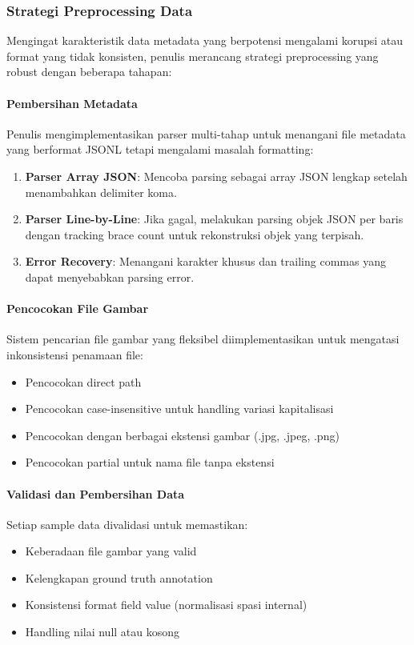 \subsubsection{Strategi Preprocessing Data}
\label{subsubsec:strategi-preprocessing-data}

Mengingat karakteristik data metadata yang berpotensi mengalami korupsi atau format yang tidak konsisten, penulis merancang strategi preprocessing yang robust dengan beberapa tahapan:

\paragraph{Pembersihan Metadata}
Penulis mengimplementasikan parser multi-tahap untuk menangani file metadata yang berformat JSONL tetapi mengalami masalah formatting:
\begin{enumerate}
    \item \textbf{Parser Array JSON}: Mencoba parsing sebagai array JSON lengkap setelah menambahkan delimiter koma.
    \item \textbf{Parser Line-by-Line}: Jika gagal, melakukan parsing objek JSON per baris dengan tracking brace count untuk rekonstruksi objek yang terpisah.
    \item \textbf{Error Recovery}: Menangani karakter khusus dan trailing commas yang dapat menyebabkan parsing error.
\end{enumerate}

\paragraph{Pencocokan File Gambar}
Sistem pencarian file gambar yang fleksibel diimplementasikan untuk mengatasi inkonsistensi penamaan file:
\begin{itemize}
    \item Pencocokan direct path
    \item Pencocokan case-insensitive untuk handling variasi kapitalisasi
    \item Pencocokan dengan berbagai ekstensi gambar (.jpg, .jpeg, .png)
    \item Pencocokan partial untuk nama file tanpa ekstensi
\end{itemize}

\paragraph{Validasi dan Pembersihan Data}
Setiap sample data divalidasi untuk memastikan:
\begin{itemize}
    \item Keberadaan file gambar yang valid
    \item Kelengkapan ground truth annotation
    \item Konsistensi format field value (normalisasi spasi internal)
    \item Handling nilai null atau kosong
\end{itemize}


